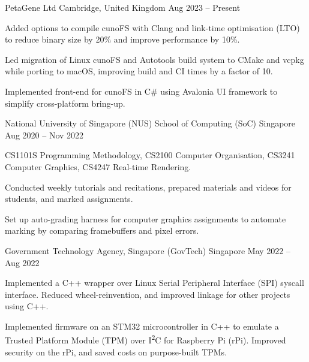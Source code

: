 \begin{cventries}
	{PetaGene Ltd} %
	{Cambridge, United Kingdom} %
	{Aug 2023 -- Present} %
	{
		\begin{cvitems} %
			\item Added options to compile cunoFS with Clang and link-time optimisation (LTO) to reduce binary size by 20\% and improve performance by 10\%.
			\item Led migration of Linux cunoFS and Autotools build system to CMake and vcpkg while porting to macOS, improving build and CI times by a factor of 10.
			\item Implemented front-end for cunoFS in C\# using Avalonia UI framework to simplify cross-platform bring-up.
		\end{cvitems}
	}


	{National University of Singapore (NUS) School of Computing (SoC)} %
	{Singapore} %
	{Aug 2020 -- Nov 2022} %
	{
		\begin{cvitems} %
			\item CS1101S Programming Methodology, CS2100 Computer Organisation, CS3241 Computer Graphics, CS4247 Real-time Rendering.
			\item Conducted weekly tutorials and recitations, prepared materials and videos for students, and marked assignments.
			\item Set up auto-grading harness for computer graphics assignments to automate marking by comparing framebuffers and pixel errors.
		\end{cvitems}
	}


	{Government Technology Agency, Singapore (GovTech)} %
	{Singapore} %
	{May 2022 -- Aug 2022} %
	{
		\begin{cvitems} %
			\item Implemented a C++ wrapper over Linux Serial Peripheral Interface (SPI) syscall interface. Reduced wheel-reinvention, and improved linkage for other projects using C++.
			\item Implemented firmware on an STM32 microcontroller in C++ to emulate a Trusted Platform Module (TPM) over I\textsuperscript{2}C for Raspberry Pi (rPi). Improved security on the rPi, and saved costs on purpose-built TPMs.
		\end{cvitems}
	}


\end{cventries}
